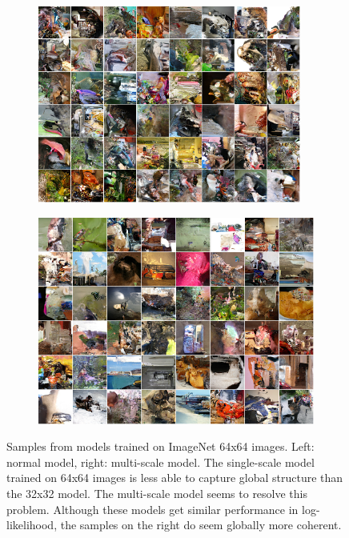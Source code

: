 \begin{figure}[ht]

\begin{subfigure}{.5\textwidth}
  \centering
  \includegraphics[trim={0 0 0 0},clip, width=0.95\textwidth]{samples_ims64_nl3_nh500_cropped.png}
\end{subfigure}%
\hfill
\begin{subfigure}{.5\textwidth}
  \centering
  \includegraphics[trim={0 0 0 0},clip, width=0.95\linewidth]{ims64_multiscale_cropped.png}
\end{subfigure}%
\hfill
\caption{Samples from models trained on ImageNet 64x64 images. Left: normal model, right: multi-scale model. The single-scale model trained on 64x64 images is less able to capture global structure than the 32x32 model. The multi-scale model seems to resolve this problem. Although these models get similar performance in log-likelihood, the samples on the right do seem globally more coherent.}
\label{fig:samples_64}
\end{figure}

